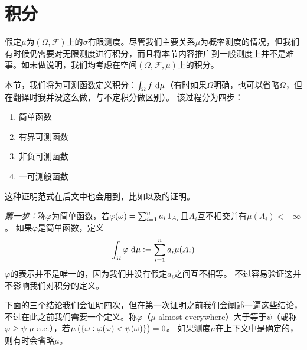 \documentclass[../main.tex]{subfiles}
\begin{document}
\section{积分} \label{sec:1.4}
假定\(\mu\)为\((\Omega,\mathcal{F})\)上的\(\sigma\)有限测度。尽管我们主要关系\(\mu\)为概率测度的情况，但我们有时候仍需要对无限测度进行积分，而且将本节内容推广到一般测度上并不是难事。如未做说明，我们均考虑在空间\((\Omega,\mathcal{F},\mu)\)上的积分。

本节，我们将为可测函数定义积分：\(\int_\Omega f\,\dif \mu\)（有时如果\(\Omega\)明确，也可以省略\(\Omega\)，但在翻译时我并没这么做，与不定积分做区别）。
该过程分为四步：
\begin{enumerate}
	\item 简单函数
	\item 有界可测函数
	\item 非负可测函数
	\item 一可测般函数
\end{enumerate}
这种证明范式在后文中也会用到，比如以及的证明。

\textit{第一步：}称\(\varphi\)为简单函数，若\(\varphi(\omega)=\sum_{i=1}^na_i\operatorname{1}_{A_i}\)且\(A_i\)互不相交并有\(\mu(A_i)<+\infty\)。
如果\(\varphi\)是简单函数，定义
\[\int_\Omega\varphi\,\dif\mu:=\sum_{i=1}^na_i\mu(A_i)\]
\(\varphi\)的表示并不是唯一的，因为我们并没有假定\(a_i\)之间互不相等。
不过容易验证这并不影响我们对积分的定义。

下面的三个结论我们会证明四次，但在第一次证明之前我们会阐述一遍这些结论，不过在此之前我们需要一个定义。称\(\varphi\)（\(\mu\)-almost everywhere）大于等于\(\psi\)（或称\(\varphi\geq\psi\) \(\mu\)-a.e.），若\(\mu\del{\{\omega:\varphi(\omega)<\psi(\omega)\}}=0\)。
如果测度\(\mu\)在上下文中是确定的，则有时会省略\(\mu\)。
\end{document}
